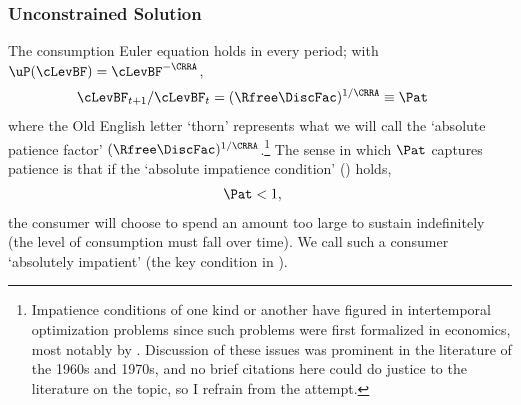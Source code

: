 \documentclass[BufferStockTheory]{subfiles}
\begin{document}
\hypertarget{Unconstrained-Solution}{}
\subsubsection{Unconstrained Solution} \label{subsec:PFUncon}

\hypertarget{APF}{}
\hypertarget{AIC}{}
The consumption Euler equation holds in every period; with $\uP(\cLevBF)=\cLevBF^{-\CRRA}$, \hypertarget{Pat}{}
\begin{align}
  \cLevBF_{t+1}/\cLevBF_{t}  & = (\Rfree\DiscFac)^{1/\CRRA} \equiv \Pat   \label{eq:Pat}
\end{align}
where the Old English letter `thorn' represents what we will call the
`absolute patience factor' $(\Rfree
\DiscFac)^{1/\CRRA}$.\footnote{Impatience conditions of one kind or
  another have figured in intertemporal optimization problems since
  such problems were first formalized in economics, most notably by \cite{ramseySave}.
  Discussion of these issues was prominent in the literature of the
  1960s and 1970s, and no brief citations here could do justice to the literature on the topic, so I refrain from the attempt.}  The sense in which $\Pat$ captures
patience is that if the `absolute impatience condition' (\AIC) holds,
\begin{align}
  \label{eq:AIC}
  \Pat  & < 1,
\end{align}
the consumer will choose to spend an amount too large to sustain indefinitely (the
level of consumption must fall over time).  We call such a consumer `absolutely impatient' (the key condition in \cite{bewleyPIH}).
\end{document}
